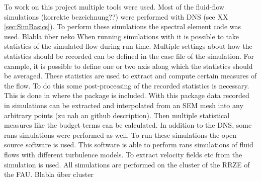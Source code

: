 To work on this project multiple tools were used. Most of the fluid-flow simulations (korrekte bezeichnung??) were performed with DNS (see XX \autoref{sec:SimBasics}). To perform these simulations the spectral element code  was used. Blabla über neko
When running simulations with  it is possible to take statistics of the simulated flow during run time. Multiple settings about how the statistics should be recorded can be defined in the case file of the simulation. For example, it is possible to define one or two axis along which the statistics should be averaged. These statistics are used to extract and compute certain measures of the flow. To do this some post-processing of the recorded statistics is necessary. This is done in  where the package  is included. With this package data recorded in  simulations can be extracted and interpolated from an SEM mesh into any arbitrary points (zu nah an github description). Then multiple statistical measures like the budget terms can be calculated. 
In addition to the DNS, some \acrshort{rans} simulations were performed as well. To run these simulations the open source software  is used. This software is able to perform \acrshort{rans} simulations of fluid flows with different turbulence models. To extract velocity fields etc from the simulation  is used. 
All simulations are performed on the cluster of the RRZE of the FAU. Blabla über cluster
